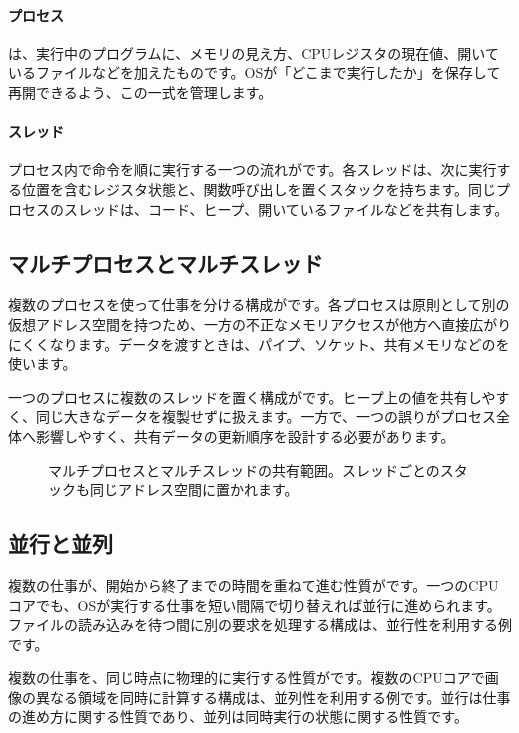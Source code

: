 \paragraph{プロセス}
は、実行中のプログラムに、メモリの見え方、CPUレジスタの現在値、開いているファイルなどを加えたものです。OSが「どこまで実行したか」を保存して再開できるよう、この一式を管理します。

\paragraph{スレッド}
プロセス内で命令を順に実行する一つの流れがです。各スレッドは、次に実行する位置を含むレジスタ状態と、関数呼び出しを置くスタックを持ちます。同じプロセスのスレッドは、コード、ヒープ、開いているファイルなどを共有します。

\subsection{マルチプロセスとマルチスレッド}

複数のプロセスを使って仕事を分ける構成がです。各プロセスは原則として別の仮想アドレス空間を持つため、一方の不正なメモリアクセスが他方へ直接広がりにくくなります。データを渡すときは、パイプ、ソケット、共有メモリなどのを使います。

一つのプロセスに複数のスレッドを置く構成がです。ヒープ上の値を共有しやすく、同じ大きなデータを複製せずに扱えます。一方で、一つの誤りがプロセス全体へ影響しやすく、共有データの更新順序を設計する必要があります。

\begin{figure}[htbp]
  \centering
  \caption{マルチプロセスとマルチスレッドの共有範囲。スレッドごとのスタックも同じアドレス空間に置かれます。}
  \label{fig:process-thread-sharing}
\end{figure}

\subsection{並行と並列}

複数の仕事が、開始から終了までの時間を重ねて進む性質がです。一つのCPUコアでも、OSが実行する仕事を短い間隔で切り替えれば並行に進められます。ファイルの読み込みを待つ間に別の要求を処理する構成は、並行性を利用する例です。

複数の仕事を、同じ時点に物理的に実行する性質がです。複数のCPUコアで画像の異なる領域を同時に計算する構成は、並列性を利用する例です。並行は仕事の進め方に関する性質であり、並列は同時実行の状態に関する性質です。

